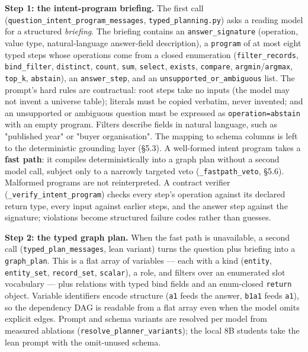 \documentclass[10pt]{article} %
\begin{document}
\textbf{Step 1: the intent-program briefing.} The first call (\texttt{question\_intent\_program\_messages}, \texttt{typed\_planning.py}) asks a reading model for a structured \emph{briefing}. The briefing contains an \texttt{answer\_signature} (operation, value type, natural-language answer-field description), a \texttt{program} of at most eight typed steps whose operations come from a closed enumeration (\texttt{filter\_records}, \texttt{bind\_filter}, \texttt{distinct}, \texttt{count}, \texttt{sum}, \texttt{select}, \texttt{exists}, \texttt{compare}, \texttt{argmin}/\texttt{argmax}, \texttt{top\_k}, \texttt{abstain}), an \texttt{answer\_step}, and an \texttt{unsupported\_or\_ambiguous} list. The prompt's hard rules are contractual: root steps take no inputs (the model may not invent a universe table); literals must be copied verbatim, never invented; and an unsupported or ambiguous question must be expressed as \texttt{operation=abstain} with an empty program. Filters describe fields in natural language, such as "published year" or "buyer organisation". The mapping to schema columns is left to the deterministic grounding layer (\S5.3). A well-formed intent program takes a \textbf{fast path}: it compiles deterministically into a graph plan without a second model call, subject only to a narrowly targeted veto (\texttt{\_fastpath\_veto}, \S5.6). Malformed programs are not reinterpreted. A contract verifier (\texttt{\_verify\_intent\_program}) checks every step's operation against its declared return type, every input against earlier steps, and the answer step against the signature; violations become structured failure codes rather than guesses.

\textbf{Step 2: the typed graph plan.} When the fast path is unavailable, a second call (\texttt{typed\_plan\_messages}, lean variant) turns the question plus briefing into a \texttt{graph\_plan}. This is a flat array of variables --- each with a kind (\texttt{entity}, \texttt{entity\_set}, \texttt{record\_set}, \texttt{scalar}), a role, and filters over an enumerated slot vocabulary --- plus relations with typed bind fields and an enum-closed \texttt{return} object. Variable identifiers encode structure (\texttt{a1} feeds the answer, \texttt{b1a1} feeds \texttt{a1}), so the dependency DAG is readable from a flat array even when the model omits explicit edges. Prompt and schema variants are resolved per model from measured ablations (\texttt{resolve\_planner\_variants}); the local 8B students take the lean prompt with the omit-unused schema.
\end{document}
